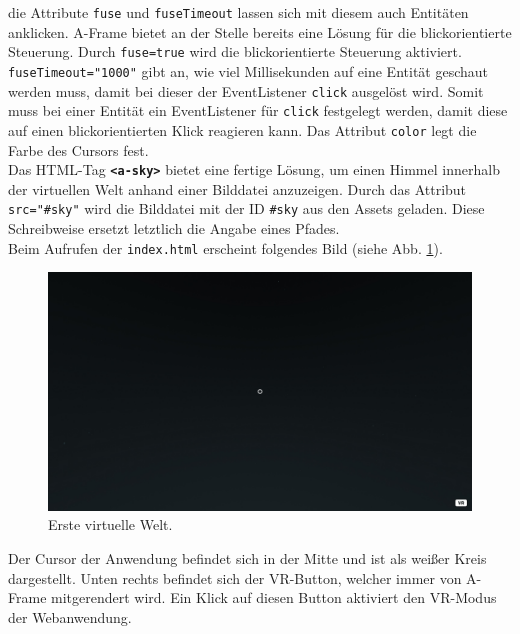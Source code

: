 \documentclass[a4paper,12pt,oneside]{article}
\begin{document}
        die Attribute \texttt{fuse} und \texttt{fuseTimeout} lassen sich mit
        diesem auch Entitäten anklicken. A-Frame bietet an der Stelle bereits
        eine Lösung für die blickorientierte Steuerung. Durch 
        \texttt{fuse=true} wird die blickorientierte Steuerung aktiviert.
        \texttt{fuseTimeout="1000"} gibt an, wie viel Millisekunden 
        auf eine Entität geschaut werden muss, 
        damit bei dieser der EventListener
        \texttt{click} ausgelöst wird. Somit muss bei einer Entität ein
        EventListener für \texttt{click} festgelegt werden, damit diese auf
        einen blickorientierten Klick reagieren kann. Das Attribut 
        \texttt{color} legt die Farbe des Cursors fest. \\
        Das HTML-Tag \texttt{\textbf{<a-sky>}} bietet eine fertige Lösung,
        um einen Himmel innerhalb der virtuellen Welt anhand einer Bilddatei
        anzuzeigen. Durch das Attribut \texttt{src="\#sky"} wird die
        Bilddatei mit der ID \texttt{\#sky} aus den Assets geladen. Diese
        Schreibweise ersetzt letztlich die Angabe eines Pfades. \\
        Beim Aufrufen der \texttt{index.html} erscheint folgendes Bild
        (siehe Abb. \ref{fig:vr-welt1}).
        \begin{figure}[h]
          \centering
          \includegraphics[scale=0.3]{img/coding/vr-welt1.png}
          \caption{Erste virtuelle Welt.}
          \label{fig:vr-welt1}
        \end{figure}
        Der Cursor der Anwendung befindet sich in der Mitte und ist als weißer
        Kreis dargestellt. Unten rechts befindet sich der VR-Button, welcher
        immer von A-Frame mitgerendert wird. Ein Klick auf diesen Button 
        aktiviert den VR-Modus der Webanwendung. \\
\end{document}
